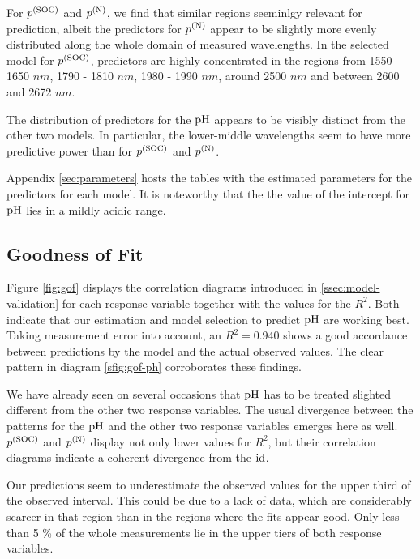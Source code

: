 		For $p^{(\mathrm{SOC})}$ and $p^{(\mathrm{N})}$, we find that similar regions seeminlgy relevant for prediction, albeit the predictors for $p^{(\mathrm{N})}$ appear to be slightly more evenly distributed along the whole domain of measured wavelengths. %
		In the selected model for $p^{(\mathrm{SOC})}$, predictors are highly concentrated in the regions from 1550 - 1650 $\unit{nm}$, 1790 - 1810 $\unit{nm}$, 1980 - 1990 $\unit{nm}$, around 2500 $\unit{nm}$ and between 2600 and 2672 $\unit{nm}$.
		
		The distribution of predictors for the $\mathrm{pH}$ appears to be visibly distinct from the other two models.
		In particular, the lower-middle wavelengths seem to have more predictive power than for $p^{(\mathrm{SOC})}$ and $p^{(\mathrm{N})}$.
		
		Appendix \ref{sec:parameters} hosts the tables with the estimated parameters for the predictors for each model.
		It is noteworthy that the the value of the intercept for $\mathrm{pH}$  lies in a mildly acidic range. %

				

	\subsection{Goodness of Fit}
	\label{ssec:suitability}
	
		Figure \ref{fig:gof} displays the correlation diagrams introduced in \ref{ssec:model-validation} for each response variable together with the values for the $R^2$.
		Both indicate that our estimation and model selection to predict $\mathrm{pH}$ are working best.
		Taking measurement error into account, an $R^2 = 0.940$ shows a good accordance between predictions by the model and the actual observed values.
		The clear pattern in diagram \ref{sfig:gof-ph} corroborates these findings.
		
		We have already seen on several occasions that $\mathrm{pH}$ has to be treated slighted different from the other two response variables.
		The usual divergence between the patterns for the $\mathrm{pH}$ and the other two response variables emerges here as well.
		$p^{\mathrm{(SOC)}}$ and $p^{\mathrm{(N)}}$ display not only lower values for $R^2$, but their correlation diagrams indicate a coherent divergence from the $\operatorname{id}$.
		
		Our predictions seem to underestimate the observed values for the upper third of the observed interval.
		This could be due to a lack of data, which are considerably scarcer in that region than in the regions where the fits appear good.
		Only less than 5 \% of the whole measurements lie in the upper tiers of both response variables.
		
